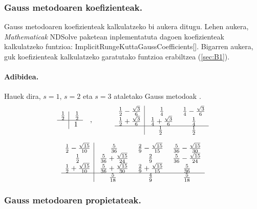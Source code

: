 \subsubsection*{Gauss metodoaren koefizienteak.}

Gauss metodoaren koefizienteak kalkulatzeko bi aukera ditugu. Lehen aukera,  \emph{Mathematicak} NDSolve paketean inplementatuta dagoen koefizienteak kalkulatzeko funtzioa: ImplicitRungeKuttaGaussCoefficients[]. Bigarren aukera, guk koefizienteak kalkulatzeko garatutako funtzioa erabiltzea (\ref{sec:B1}).  

\paragraph{Adibidea.} Hauek dira, $s=1$, $s=2$ eta $s=3$ ataletako Gauss metodoak \cite{Hairer2006}.
\begin{equation*}
\begin{array}{c|c}
  \frac{1}{2} & \ \frac{1}{2} \\
  \hline
   & 1 \\
\end{array} \ \ \ ,  \ \ \ \ \ \ \ \ \
\begin{array}{c|c c}
  \frac{1}{2}-\frac{\sqrt{3}}{6} & \ \frac{1}{4} & \ \frac{1}{4}-\frac{\sqrt{3}}{6} \\
  \frac{1}{2}+\frac{\sqrt{3}}{6} & \ \frac{1}{4}+\frac{\sqrt{3}}{6} & \ \frac{1}{4} \\
  \hline
         &  \frac{1}{2} & \ \frac{1}{2} \\
\end{array}
\end{equation*}

\begin{equation*}
\begin{array}{c|c c c}
  \frac{1}{2}-\frac{\sqrt{15}}{10} & \ \frac{5}{36} & \ \frac{2}{9}-\frac{\sqrt{15}}{15} & \ \frac{5}{36}-\frac{\sqrt{15}}{30} \\
  \frac{1}{2}   & \ \frac{5}{36}+\frac{\sqrt{15}}{24} & \ \frac{2}{9} & \ \frac{5}{36}-\frac{\sqrt{15}}{24} \\
  \frac{1}{2}+\frac{\sqrt{15}}{10}   & \ \frac{5}{36}+\frac{\sqrt{15}}{30} & \ \frac{2}{9}+\frac{\sqrt{15}}{15} & \ \frac{5}{36} \\
  \hline
  & \frac{5}{18} & \ \frac{4}{9} & \ \frac{5}{18}
\end{array}
\end{equation*}

\subsubsection*{Gauss metodoaren propietateak.}

